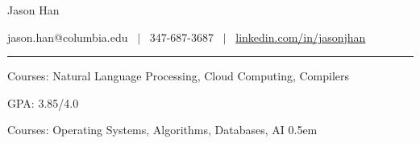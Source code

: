 \documentclass[11pt]{article}
\makeatletter
\def\hrulefill{\leavevmode\leaders\hrule height 1pt\hfill\kern\z@}
\newenvironment{resumesection}[1]{{\large \textbf{#1}}\hrulefill\smallskip\par}
\newcommand{\resumeentry}[4]{%
\textbf{#1} \hfill {\small #2}
\par
{\small #3} \hfill {\small #4}}
\makeatother
\begin{document}
{\centering%
{\huge Jason Han \par}
\medskip
{jason.han@columbia.edu ~$\vert$~ {\small 347-687-3687} ~$\vert$~ \href{https://www.linkedin.com/in/jasonjhan/}{linkedin.com/in/jasonjhan} \par}}

\begin{resumesection}{Education}

  {\small Courses: Natural Language Processing, Cloud Computing, Compilers}

  {\small GPA: 3.85/4.0}

  \smallskip


  {\small Courses: Operating Systems, Algorithms, Databases, AI}
\end{resumesection}

\vskip 0.5em
\end{document}
